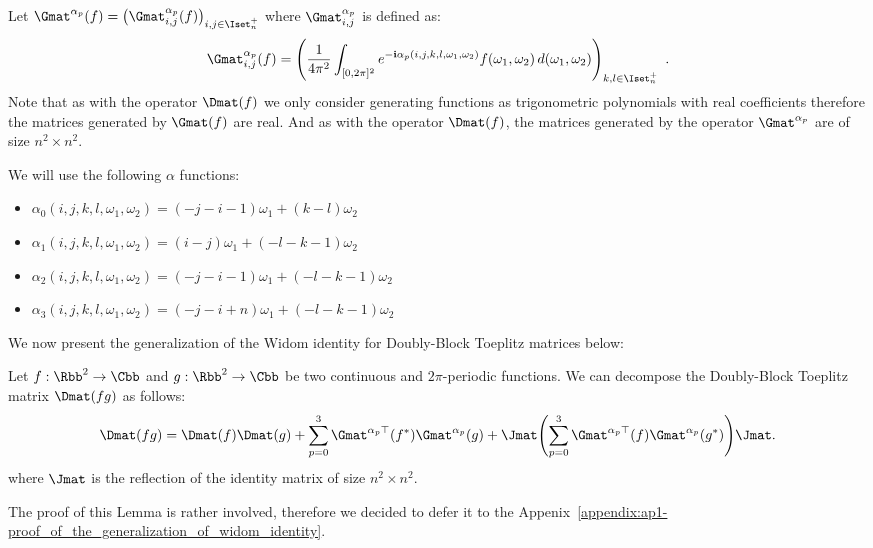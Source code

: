Let $\Gmat^{\alpha_p} (f) = \leftmat \Gmat^{\alpha_p}_{i,j}(f) \rightmat_{i,j \in \Iset^+_n}$ where $\Gmat^{\alpha_p}_{i,j}$ is defined as:
\begin{equation}
  \Gmat^{\alpha_p}_{i,j}(f) =\leftmat \frac{1}{4\pi^{2}}\int_{[0,2\pi]^{2}} e^{-\ci \alpha_p(i, j, k, l, \omega_1, \omega_2)}  f(\omega_{1},\omega_{2})\,d(\omega_{1},\omega_{2})
  \rightmat_{k,l \in \Iset^+_n} \enspace.
\end{equation}
Note that as with the operator $\Dmat(f)$ we only consider generating functions as trigonometric polynomials with real coefficients therefore the matrices generated by $\Gmat(f)$ are real. 
And as with the operator $\Dmat(f)$, the matrices generated by the operator $\Gmat^{\alpha_p}$ are of size $n^2 \times n^2$. 

\noindent
We will use the following $\alpha$ functions:
\begin{itemize}
    \item[] $\alpha_0(i, j, k, l, \omega_1, \omega_2) = (-j-i-1)\omega_1 + (k-l)\omega_2$
    \item[] $\alpha_1(i, j, k, l, \omega_1, \omega_2) = (i-j)\omega_1 + (-l-k-1)\omega_2$
    \item[] $\alpha_2(i, j, k, l, \omega_1, \omega_2) = (-j-i-1)\omega_1 + (-l-k-1)\omega_2$
    \item[] $\alpha_3(i, j, k, l, \omega_1, \omega_2) = (-j-i+n)\omega_1 + (-l-k-1)\omega_2$
\end{itemize}

\noindent
We now present the generalization of the Widom identity for Doubly-Block Toeplitz matrices below:
\begin{lemma} \label{lemma:ch5-widom_idenity}
  Let $f:\Rbb^2 \rightarrow \Cbb$ and $g:\Rbb^2 \rightarrow \Cbb$ be two continuous and $2\pi$-periodic functions. 
  We can decompose the Doubly-Block Toeplitz matrix $\Dmat(fg)$ as follows:
  \begin{equation}
      \Dmat(fg) = \Dmat(f)\Dmat(g) + \sum_{p=0}^3 \Gmat^{\alpha_p \top}(f^*) \Gmat^{\alpha_p}(g) + \Jmat \left( \sum_{p=0}^3 \Gmat^{\alpha_p \top}(f) \Gmat^{\alpha_p }(g^*) \right) \Jmat.
  \end{equation}
  where $\Jmat$ is the reflection of the identity matrix of size $n^2 \times n^2$.
\end{lemma}

\noindent
The proof of this Lemma is rather involved, therefore we decided to defer it to the Appenix~\ref{appendix:ap1-proof_of_the_generalization_of_widom_identity}.

